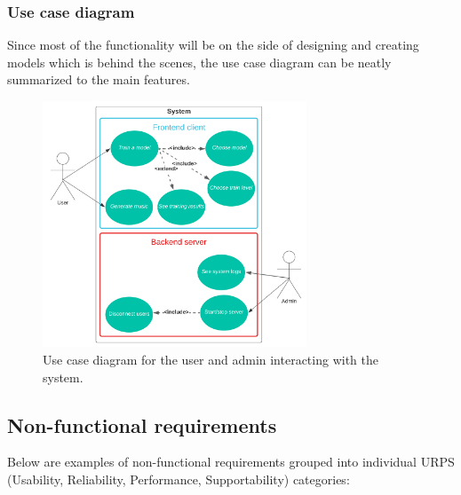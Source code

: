 \documentclass{article}
\begin{document}
\newpage
\subsubsection{Use case diagram}

Since most of the functionality will be on the side of designing and creating models which is behind the scenes, the use case diagram can be neatly summarized to the main features.


\begin{figure}[H]
    \centering
    \includegraphics[width=0.7\textwidth]{use_case_diagram.png}
    \caption{Use case diagram for the user and admin interacting with the system.}
    \label{fig:use-case-diagram}
\end{figure}

\subsection{Non-functional requirements}
Below are examples of non-functional requirements grouped into individual URPS (Usability, Reliability, Performance, Supportability) categories:
\end{document}
